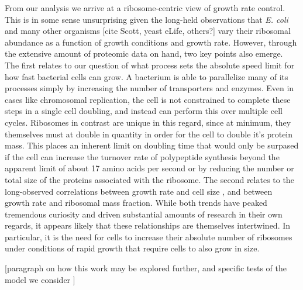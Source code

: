 From our analysis we arrive at a ribosome-centric view of growth rate control.
This is in some sense unsurprising  given the long-held observations that
\textit{E. coli} and many other organisms [cite Scott, yeast eLife, others?]
vary their ribosomal abundance as a function of growth conditions and growth
rate. However, through the extensive amount of proteomic data on hand, two key
points also emerge. The first relates to our question of what process sets the
absolute speed limit for how fast bacterial cells can grow.  A bacterium is able
to parallelize many of its processes simply by increasing the number of
transporters and  enzymes.  Even in cases like chromosomal replication, the cell
is not constrained to complete these steps in a single cell doubling, and
instead can perform this over multiple  cell cycles. Ribosomes in contrast are
unique in this regard, since at minimum, they themselves  must at double in
quantity in order for the cell to double it's protein mass. This places an
inherent limit on doubling time that would only be surpased if the cell can
increase the turnover rate of   polypeptide synthesis beyond the apparent limit
of about 17 amino acids per second  or by reducing the number or total size of
the proteins associated with the ribosome. The second relates to the
long-observed correlations between growth rate and cell size
\citep{schaechter1958, si2017}, and between growth rate and ribosomal mass
fraction. While both trends have peaked tremendous curiosity and driven
substantial amounts of research in their own regards, it appears likely that
these relationships are themselves intertwined. In particular, it is the need
for cells to increase their absolute number of ribosomes under conditions of
rapid growth that require cells to also grow in size. 



[paragraph on how this work may be explored further, and specific tests of the model we consider ]

%
%
%
%
%
%


